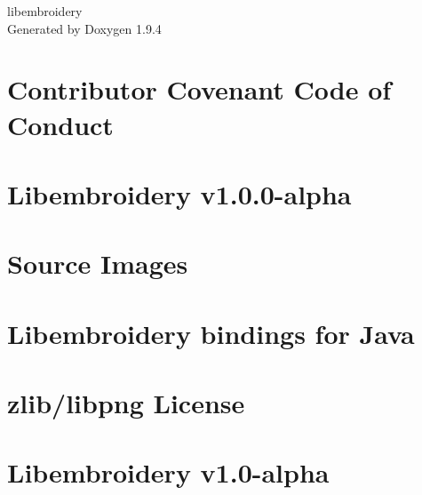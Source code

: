 \documentclass[twoside]{book}
\newcommand{\+}{\discretionary{\mbox{\scriptsize$\hookleftarrow$}}{}{}}
\newcommand{\clearemptydoublepage}{%
    \newpage{\pagestyle{empty}\cleardoublepage}%
  }
\begin{document}
  \raggedbottom
    \hypersetup{pageanchor=false,
                bookmarksnumbered=true,
                pdfencoding=unicode
               }
  \begin{titlepage}
  \vspace*{7cm}
  \begin{center}%
  {\Large libembroidery}\\
  \vspace*{1cm}
  {\large Generated by Doxygen 1.9.4}\\
  \end{center}
  \end{titlepage}
  \clearemptydoublepage
  \tableofcontents
  \clearemptydoublepage
  \hypersetup{pageanchor=true}
\chapter{Contributor Covenant Code of Conduct}
\label{md_docs_CODE_OF_CONDUCT}

\chapter{Libembroidery v1.0.0-\/alpha}
\label{md_docs_manual}

\chapter{Source Images}
\label{md_images_README}

\chapter{Libembroidery bindings for Java}
\label{md_java_README}

\chapter{zlib/libpng License}
\label{md_LICENSE}

\chapter{Libembroidery v1.0-\/alpha}
\label{md_python_README}

\end{document}
